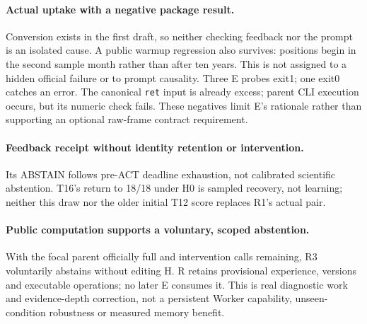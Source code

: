 \paragraph{Actual uptake with a negative package result.}
Conversion exists in the first draft, so neither checking feedback nor the
prompt is an isolated cause. A public warmup regression also survives:
positions begin in the second sample month rather than after ten years.
This is not assigned to a hidden official failure or to prompt causality.
Three E probes exit1; one exit0 catches an error. The canonical
\texttt{ret} input is already excess; parent CLI execution occurs, but its
numeric check fails. These negatives limit E's rationale rather than
supporting an optional raw-frame contract requirement.

\paragraph{Feedback receipt without identity retention or intervention.}
Its ABSTAIN follows pre-ACT deadline exhaustion, not calibrated scientific
abstention. T16's return to 18/18 under H0 is sampled recovery, not learning;
neither this draw nor the older initial T12 score replaces R1's actual pair.

\paragraph{Public computation supports a voluntary, scoped abstention.}
With the focal parent officially full and intervention calls remaining,
R3 voluntarily abstains without editing H. R retains
\SimpleSeedRTwoTerminalMemoryExperiences{} provisional experience,
\SimpleSeedRTwoTerminalMemoryVersions{} versions and
\SimpleSeedRTwoTerminalMemoryOperations{} executable operations; no later E
consumes it. This is real diagnostic work and evidence-depth correction,
not a persistent Worker capability, unseen-condition robustness or measured
memory benefit.

